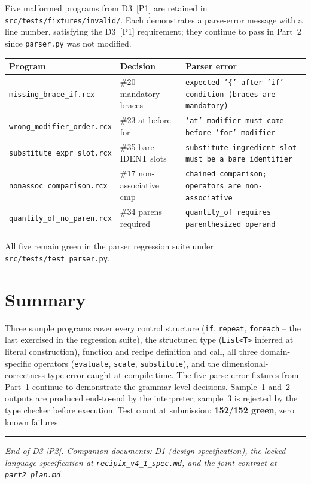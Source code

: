\documentclass[11pt,a4paper]{article}
\begin{document}
Five malformed programs from D3~[P1] are retained in
\texttt{src/tests/fixtures/invalid/}. Each demonstrates a parse-error
message with a line number, satisfying the D3~[P1] requirement; they
continue to pass in Part~2 since \texttt{parser.py} was not modified.

\begin{center}
\begin{tabular}{@{}p{}p{}p{}@{}}
\toprule
\textbf{Program} & \textbf{Decision} & \textbf{Parser error} \\
\midrule
\texttt{missing\_brace\_if.rcx}      & \#20 mandatory braces       & \texttt{expected '\{' after 'if' condition (braces are mandatory)} \\
\texttt{wrong\_modifier\_order.rcx}  & \#23 at-before-for          & \texttt{'at' modifier must come before 'for' modifier} \\
\texttt{substitute\_expr\_slot.rcx}  & \#35 bare-IDENT slots       & \texttt{substitute ingredient slot must be a bare identifier} \\
\texttt{nonassoc\_comparison.rcx}    & \#17 non-associative cmp    & \texttt{chained comparison; operators are non-associative} \\
\texttt{quantity\_of\_no\_paren.rcx} & \#34 parens required        & \texttt{quantity\_of requires parenthesized operand} \\
\bottomrule
\end{tabular}
\end{center}

\noindent All five remain green in the parser regression suite under
\texttt{src/tests/test\_parser.py}.


\section{Summary}

Three sample programs cover every control structure (\texttt{if},
\texttt{repeat}, \texttt{foreach} -- the last exercised in the
regression suite), the structured type (\texttt{List<T>} inferred at
literal construction), function and recipe definition and call, all
three domain-specific operators (\texttt{evaluate}, \texttt{scale},
\texttt{substitute}), and the dimensional-correctness type error
caught at compile time. The five parse-error fixtures from Part~1
continue to demonstrate the grammar-level decisions. Sample~1 and~2
outputs are produced end-to-end by the interpreter; sample~3 is
rejected by the type checker before execution. Test count at
submission: \textbf{152/152 green}, zero known failures.

\vfill
\noindent\rule{\textwidth}{0.4pt}
\begin{center}
\small
\emph{End of D3 [P2]. Companion documents: D1 (design specification),
the locked language specification at \texttt{recipix\_v4\_1\_spec.md},
and the joint contract at \texttt{part2\_plan.md}.}
\end{center}
\end{document}
